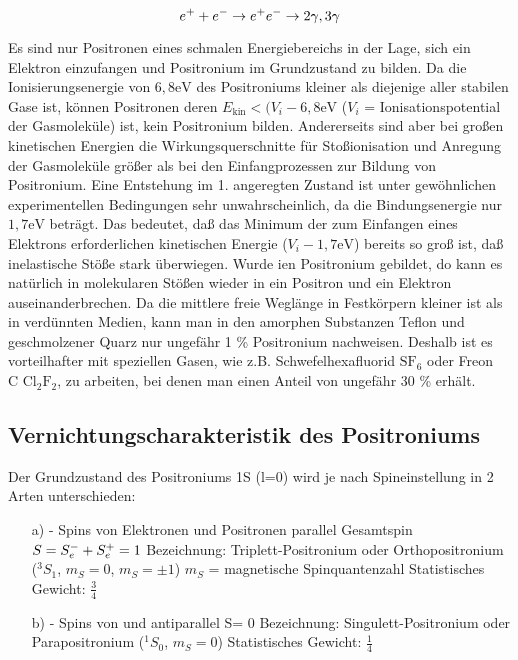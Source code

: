 \begin{equation*}
 e^+ + e^- \rightarrow e^+ e^- \rightarrow 2\gamma, 3\gamma
\end{equation*}

Es sind nur Positronen eines schmalen Energiebereichs in der Lage, sich ein Elektron einzufangen und Positronium im Grundzustand zu bilden.
Da die Ionisierungsenergie von $6,8 \text{eV}$ des Positroniums kleiner als diejenige aller stabilen Gase ist, können Positronen deren $E_\text{kin} < (V_i - 6,8 \text{eV}$ ($V_i$ = Ionisationspotential der Gasmoleküle) ist, kein Positronium bilden. Andererseits sind aber bei großen kinetischen Energien die Wirkungsquerschnitte für Stoßionisation und Anregung der Gasmoleküle größer als bei den Einfangprozessen zur Bildung von Positronium. Eine Entstehung im 1. angeregten Zustand ist unter gewöhnlichen experimentellen Bedingungen sehr unwahrscheinlich, da die Bindungsenergie nur $1,7 \text{eV}$ beträgt. Das bedeutet, daß das Minimum der zum Einfangen eines Elektrons erforderlichen kinetischen Energie ($V_i - 1,7 \text{eV}$) bereits so groß ist, daß inelastische Stöße stark überwiegen. Wurde ien Positronium gebildet, do kann es natürlich in molekularen Stößen wieder in ein Positron und ein Elektron auseinanderbrechen. Da die mittlere freie Weglänge in Festkörpern kleiner ist als in verdünnten Medien, kann man in den amorphen Substanzen Teflon und geschmolzener Quarz nur ungefähr 1 \% Positronium nachweisen. Deshalb ist es vorteilhafter mit speziellen Gasen, wie z.B. Schwefelhexafluorid $\text{SF}_6$ oder Freon $\text{C Cl}_2\text{F}_2$, zu arbeiten, bei denen man einen Anteil von ungefähr 30 \% erhält.

\subsection{Vernichtungscharakteristik des Positroniums}

Der Grundzustand des Positroniums 1S (l=0) wird je nach Spineinstellung in 2 Arten unterschieden:
\begin{enumerate}
 \item[a)] - Spins von Elektronen \elektron und Positronen \positron parallel
Gesamtspin $S = S_\elektron + S_\positron = 1$
Bezeichnung: Triplett-Positronium oder Orthopositronium (${}^3S_1$, $m_S = 0$, $m_S = \pm 1$)
$m_S$ = magnetische Spinquantenzahl
Statistisches Gewicht: $\frac{3}{4}$

 \item[b)] - Spins von \elektron und \positron antiparallel
S= 0
Bezeichnung: Singulett-Positronium oder Parapositronium (${}^1S_0$, $m_S = 0$)
Statistisches Gewicht: $\frac{1}{4}$ 
\end{enumerate}

